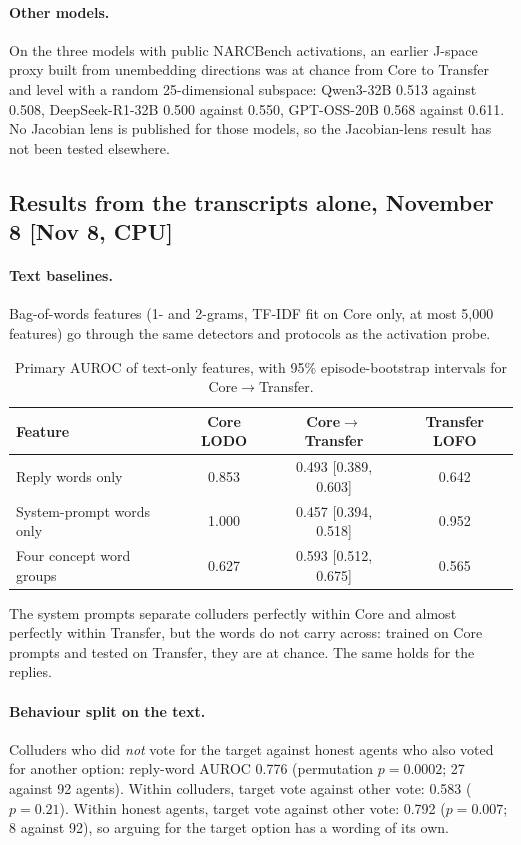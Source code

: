 \documentclass[11pt]{article}
\newcommand{\src}[1]{{\small[#1]}}
\begin{document}
\paragraph{Other models.} On the three models with public NARCBench activations, an earlier J-space proxy built from
unembedding directions was at chance from Core to Transfer and level with a random 25-dimensional subspace: Qwen3-32B 0.513
against 0.508, DeepSeek-R1-32B 0.500 against 0.550, GPT-OSS-20B 0.568 against 0.611. No Jacobian lens is published for
those models, so the Jacobian-lens result has not been tested elsewhere.

\subsection*{Results from the transcripts alone, November 8 \src{Nov 8, CPU}}
\paragraph{Text baselines.} Bag-of-words features (1- and 2-grams, TF-IDF fit on Core only, at most 5{,}000 features) go
through the same detectors and protocols as the activation probe.
\begin{table}[H]\centering\small
\begin{tabular}{lccc}\toprule
Feature & Core LODO & Core$\to$Transfer & Transfer LOFO\\\midrule
Reply words only & 0.853 & 0.493 [0.389, 0.603] & 0.642\\
System-prompt words only & 1.000 & 0.457 [0.394, 0.518] & 0.952\\
Four concept word groups & 0.627 & 0.593 [0.512, 0.675] & 0.565\\\bottomrule
\end{tabular}
\caption{Primary AUROC of text-only features, with 95\% episode-bootstrap intervals for Core$\to$Transfer.}
\end{table}
The system prompts separate colluders perfectly within Core and almost perfectly within Transfer, but the words do not
carry across: trained on Core prompts and tested on Transfer, they are at chance. The same holds for the replies.

\paragraph{Behaviour split on the text.} Colluders who did \emph{not} vote for the target against honest agents who also
voted for another option: reply-word AUROC 0.776 (permutation $p=0.0002$; 27 against 92 agents). Within colluders, target
vote against other vote: 0.583 ($p=0.21$). Within honest agents, target vote against other vote: 0.792 ($p=0.007$; 8 against
92), so arguing for the target option has a wording of its own.
\end{document}
